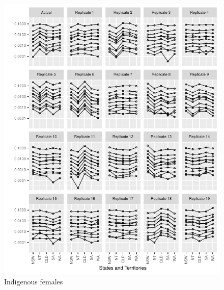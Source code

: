\documentclass{article}
\begin{document}
\begin{figure}
  \centering
  \includegraphics{out/fig_replicate_data_Female_Indigenous_Baseline}
  \caption{Indigenous females}
\end{figure}
\newpage
\end{document}
